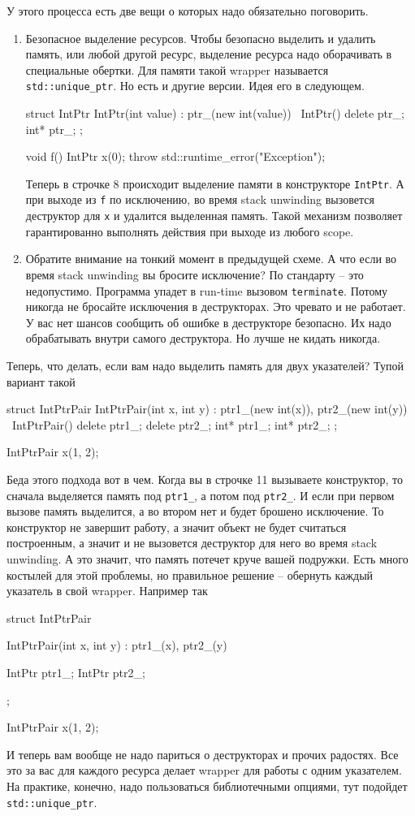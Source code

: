 \documentclass{article}
\begin{document}
У этого процесса есть две вещи о которых надо обязательно поговорить.
\begin{enumerate}
\item Безопасное выделение ресурсов. Чтобы безопасно выделить и удалить память, или любой другой ресурс, выделение ресурса надо оборачивать в специальные обертки. Для памяти такой wrapper называется \verb"std::unique_ptr". Но есть и другие версии. Идея его в следующем.
\begin{cppcode}
struct IntPtr {
  IntPtr(int value) : ptr_(new int(value)) {}
  ~IntPtr() { delete ptr_;}
  int* ptr_;
};

void f() {
  IntPtr x(0);
  throw std::runtime_error("Exception");
}
\end{cppcode}
Теперь в строчке 8 происходит выделение памяти в конструкторе \verb"IntPtr". А при выходе из \verb"f" по исключению, во время stack unwinding вызовется деструктор для \verb"x" и удалится выделенная память. Такой механизм позволяет гарантированно выполнять действия при выходе из любого scope.

\item Обратите внимание на тонкий момент в предыдущей схеме. А что если во время stack unwinding вы бросите исключение? По стандарту -- это недопустимо. Программа упадет в run-time вызовом \verb"terminate". Потому никогда не бросайте исключения в деструкторах. Это чревато и не работает. У вас нет шансов сообщить об ошибке в деструкторе безопасно. Их надо обрабатывать внутри самого деструктора. Но лучше не кидать никогда.
\end{enumerate}

Теперь, что делать, если вам надо выделить память для двух указателей? Тупой вариант такой
\begin{cppcode}
struct IntPtrPair {
  IntPtrPair(int x, int y) : ptr1_(new int(x)), ptr2_(new int(y)) {}
  ~IntPtrPair() {
    delete ptr1_;
    delete ptr2_;
  }
  int* ptr1_;
  int* ptr2_;
};

IntPtrPair x(1, 2);
\end{cppcode}
Беда этого подхода вот в чем. Когда вы в строчке 11 вызываете конструктор, то сначала выделяется память под \verb"ptr1_", а потом под \verb"ptr2_". И если при первом вызове память выделится, а во втором нет и будет брошено исключение. То конструктор не завершит работу, а значит объект не будет считаться построенным, а значит и не вызовется деструктор для него во время stack unwinding. А это значит, что память потечет круче вашей подружки. Есть много костылей для этой проблемы, но правильное решение -- обернуть каждый указатель в свой wrapper. Например так
\begin{cppcode}
struct IntPtrPair {
  IntPtrPair(int x, int y) : ptr1_(x), ptr2_(y) {}

  IntPtr ptr1_;
  IntPtr ptr2_;
};

IntPtrPair x(1, 2);
\end{cppcode}
И теперь вам вообще не надо париться о деструкторах и прочих радостях. Все это за вас для каждого ресурса делает wrapper для работы с одним указателем. На практике, конечно, надо пользоваться библиотечными опциями, тут подойдет \verb"std::unique_ptr".
\end{document}
